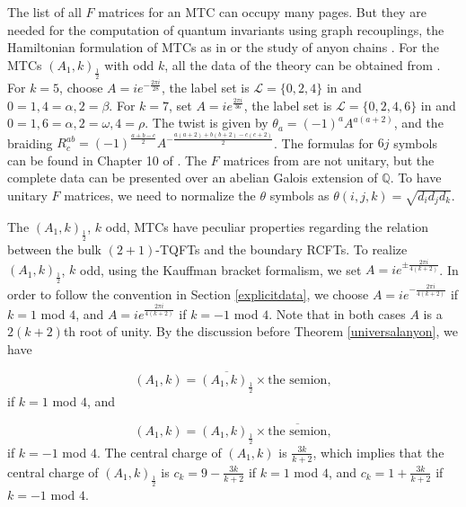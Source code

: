 \documentclass[12pt,psamsfonts]{amsart}
\newcommand{\Q}{\mathbb Q}
\newcommand{\mL}{\mathcal{L}}
\DeclareMathOperator{\SL}{SL}\DeclareMathOperator{\SU}{SU}\DeclareMathOperator{\PSL}{PSL}
\newcommand{\Z}{\mathbb Z}
\numberwithin{equation}{section}
\theoremstyle{definition}
\begin{document}
The list of all $F$ matrices for an MTC can occupy many pages. But
they are needed for the computation of quantum invariants using
graph recouplings, the Hamiltonian formulation of MTCs as in
\cite{LW} or the study of anyon chains \cite{FTL}. For the MTCs
$(A_1,k)_{\frac{1}{2}}$ with odd $k$, all the data of the theory
can be obtained from \cite{KL}. For $k=5$, choose
$A=ie^{-\frac{2\pi i}{28}}$, the label set is $\mL=\{0,2,4\}$ in
\cite{KL} and $0=1,4=\alpha,2=\beta$. For $k=7$, set
$A=ie^{\frac{2\pi i}{36}}$, the label set is $\mL=\{0,2,4,6\}$ in
\cite{KL} and $0=1,6=\alpha,2=\omega,4=\rho$. The twist is given
by $\theta_a=(-1)^a A^{a(a+2)}$, and the braiding
$R_c^{ab}=(-1)^{\frac{a+b-c}{2}}A^{-\frac{a(a+2)+b(b+2)-c(c+2)}{2}}$.
The formulas for $6j$ symbols can be found in Chapter 10 of
\cite{KL}.  The $F$ matrices from \cite{KL} are not unitary, but
the complete data can be presented over an abelian Galois
extension of $\Q$.  To have unitary $F$ matrices, we need to
normalize the $\theta$ symbols as
$\theta(i,j,k)=\sqrt{d_id_jd_k}$.

The $(A_1,k)_{\frac{1}{2}}$, $k$ odd, MTCs have peculiar
properties regarding the relation between the bulk $(2+1)$-TQFTs
and the boundary RCFTs.  To realize $(A_1,k)_{\frac{1}{2}}$, $k$
odd, using the Kauffman bracket formalism, we set $A=ie^{\pm
\frac{2\pi i}{4(k+2)}}$. In order to
follow the convention in Section \ref{explicitdata}, we choose
$A=ie^{-\frac{2\pi i}{4(k+2)}}$ if $k=1$ mod $4$, and
$A=ie^{\frac{2\pi i}{4(k+2)}}$ if $k=-1$ mod $4$.  Note that in
both cases $A$ is a $2(k+2)$th root of unity.  By the discussion
before Theorem \ref{universalanyon}, we have

\begin{equation}\label{decom1}
(A_1,k)=\overline{ (A_1,k)_{\frac{1}{2}} }\times \textrm{the
semion},
\end{equation}
if $k=1$ mod $4$, and

\begin{equation}\label{decom2}
(A_1,k)=(A_1,k)_{\frac{1}{2}}\times \overline{\textrm{the
semion}},
\end{equation}
if $k=-1$ mod $4$.  The central charge of $(A_1,k)$ is
$\frac{3k}{k+2}$, which implies that the central charge of
$(A_1,k)_{\frac{1}{2}}$ is $c_k=9-\frac{3k}{k+2}$ if $k=1$ mod
$4$, and $c_k=1+\frac{3k}{k+2}$ if $k=-1$ mod $4$.
\end{document}
